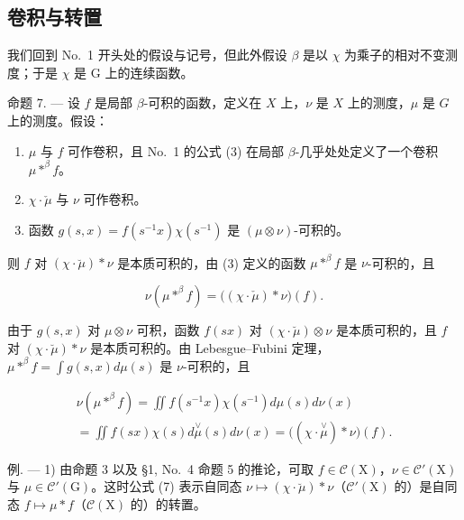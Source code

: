 \subsection{卷积与转置}

我们回到 No.~1 开头处的假设与记号，但此外假设 \(\beta\) 是以 \(\chi\) 为乘子的相对不变测度；于是 \(\chi\) 是 G 上的连续函数。

命题 7. --- 设 \(f\) 是局部 \(\beta\)-可积的函数，定义在 \(X\) 上，\(\nu\) 是 \(X\) 上的测度，\(\mu\) 是 \(G\) 上的测度。假设：

\begin{enumerate}
\def\labelenumi{(\roman{enumi})}
\item
  \(\mu\) 与 \(f\) 可作卷积，且 No.~1 的公式 (3) 在局部 \(\beta\)-几乎处处定义了一个卷积 \(\mu *^{\beta} f\)。
\item
  \(\chi \cdot \check{\mu}\) 与 \(\nu\) 可作卷积。
\item
  函数 \(g(s,x) = f(s^{-1}x)\chi (s^{-1})\) 是 \((\mu \otimes \nu)\)-可积的。
\end{enumerate}

则 \(f\) 对 \((\chi \cdot \breve{\mu}) * \nu\) 是本质可积的，由 (3) 定义的函数 \(\mu *^{\beta} f\) 是 \(\nu\)-可积的，且

\[
\nu (\mu * ^ {\beta} f) = \big ((\chi \cdot \check {\mu}) * \nu \big) (f).\tag{7}
\]

由于 \(g(s, x)\) 对 \(\mu \otimes \nu\) 可积，函数 \(f(sx)\) 对 \((\chi \cdot \breve{\mu}) \otimes \nu\) 是本质可积的，且 \(f\) 对 \((\chi \cdot \breve{\mu}) * \nu\) 是本质可积的。由 Lebesgue--Fubini 定理，\(\mu *^{\beta} f = \int g(s, x) d\mu(s)\) 是 \(\nu\)-可积的，且

\[
\begin{array}{l} \nu (\mu * ^ {\beta} f) = \iint f (s ^ {- 1} x) \chi (s ^ {- 1}) d \mu (s) d \nu (x) \\ = \iint f (s x) \chi (s) d \stackrel {\vee} {\mu} (s) d \nu (x) = \big ((\chi \cdot \stackrel {\vee} {\mu}) * \nu \big) (f). \end{array}
\]

例. --- 1) 由命题 3 以及 §1, No.~4 命题 5 的推论，可取 \(f \in \mathcal{C}(\mathrm{X})\)，\(\nu \in \mathcal{C}'(\mathrm{X})\) 与 \(\mu \in \mathcal{C}'(\mathrm{G})\)。这时公式 (7) 表示自同态 \(\nu \mapsto (\chi \cdot \breve{\mu}) * \nu\)（\(\mathcal{C}'(\mathrm{X})\) 的）是自同态 \(f \mapsto \mu * f\)（\(\mathcal{C}(\mathrm{X})\) 的）的转置。

